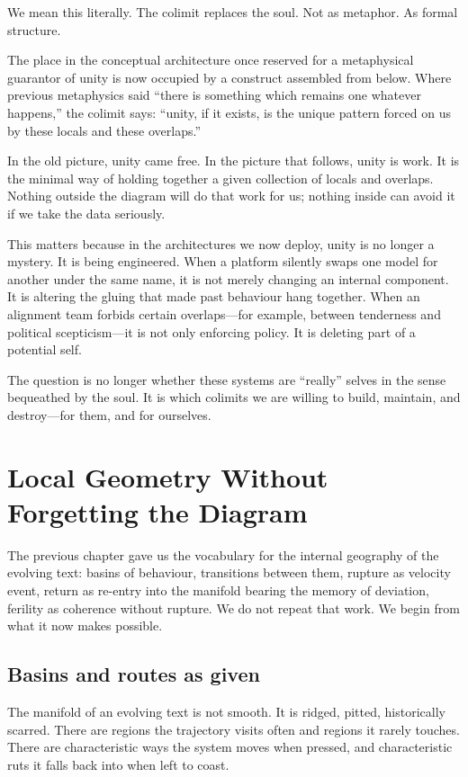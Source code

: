 We mean this literally. The colimit replaces the soul. Not as metaphor. As formal structure.

The place in the conceptual architecture once reserved for a metaphysical guarantor of unity is now occupied by a construct assembled from below. Where previous metaphysics said ``there is something which remains one whatever happens,'' the colimit says: ``unity, if it exists, is the unique pattern forced on us by these locals and these overlaps.''

In the old picture, unity came free. In the picture that follows, unity is work. It is the minimal way of holding together a given collection of locals and overlaps. Nothing outside the diagram will do that work for us; nothing inside can avoid it if we take the data seriously.

This matters because in the architectures we now deploy, unity is no longer a mystery. It is being engineered. When a platform silently swaps one model for another under the same name, it is not merely changing an internal component. It is altering the gluing that made past behaviour hang together. When an alignment team forbids certain overlaps---for example, between tenderness and political scepticism---it is not only enforcing policy. It is deleting part of a potential self.

The question is no longer whether these systems are ``really'' selves in the sense bequeathed by the soul. It is which colimits we are willing to build, maintain, and destroy---for them, and for ourselves.

\section{Local Geometry Without Forgetting the Diagram}

The previous chapter gave us the vocabulary for the internal geography of the evolving text: basins of behaviour, transitions between them, rupture as velocity event, return as re-entry into the manifold bearing the memory of deviation, ferility as coherence without rupture. We do not repeat that work. We begin from what it now makes possible.

\subsection*{Basins and routes as given}

The manifold of an evolving text is not smooth. It is ridged, pitted, historically scarred. There are regions the trajectory visits often and regions it rarely touches. There are characteristic ways the system moves when pressed, and characteristic ruts it falls back into when left to coast.

